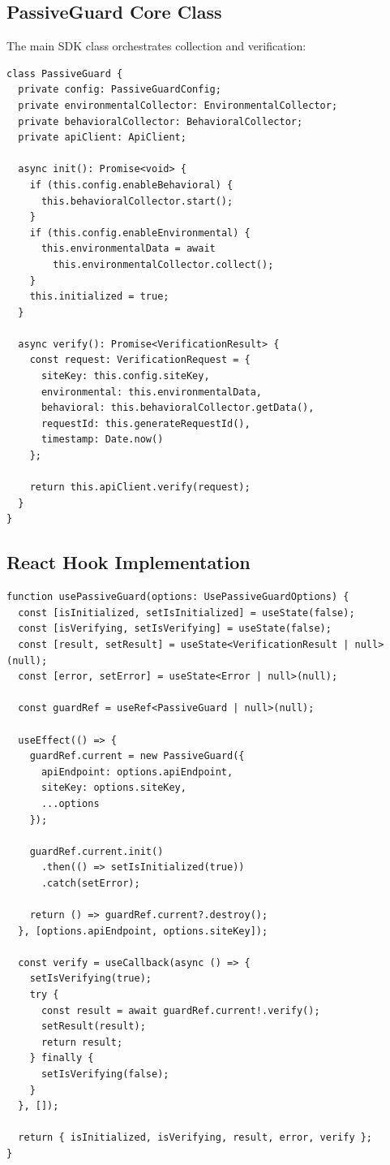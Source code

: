 \subsection{PassiveGuard Core Class}

The main SDK class orchestrates collection and verification:

\begin{verbatim}
class PassiveGuard {
  private config: PassiveGuardConfig;
  private environmentalCollector: EnvironmentalCollector;
  private behavioralCollector: BehavioralCollector;
  private apiClient: ApiClient;
  
  async init(): Promise<void> {
    if (this.config.enableBehavioral) {
      this.behavioralCollector.start();
    }
    if (this.config.enableEnvironmental) {
      this.environmentalData = await 
        this.environmentalCollector.collect();
    }
    this.initialized = true;
  }
  
  async verify(): Promise<VerificationResult> {
    const request: VerificationRequest = {
      siteKey: this.config.siteKey,
      environmental: this.environmentalData,
      behavioral: this.behavioralCollector.getData(),
      requestId: this.generateRequestId(),
      timestamp: Date.now()
    };
    
    return this.apiClient.verify(request);
  }
}
\end{verbatim}

\subsection{React Hook Implementation}

\begin{verbatim}
function usePassiveGuard(options: UsePassiveGuardOptions) {
  const [isInitialized, setIsInitialized] = useState(false);
  const [isVerifying, setIsVerifying] = useState(false);
  const [result, setResult] = useState<VerificationResult | null>(null);
  const [error, setError] = useState<Error | null>(null);
  
  const guardRef = useRef<PassiveGuard | null>(null);
  
  useEffect(() => {
    guardRef.current = new PassiveGuard({
      apiEndpoint: options.apiEndpoint,
      siteKey: options.siteKey,
      ...options
    });
    
    guardRef.current.init()
      .then(() => setIsInitialized(true))
      .catch(setError);
      
    return () => guardRef.current?.destroy();
  }, [options.apiEndpoint, options.siteKey]);
  
  const verify = useCallback(async () => {
    setIsVerifying(true);
    try {
      const result = await guardRef.current!.verify();
      setResult(result);
      return result;
    } finally {
      setIsVerifying(false);
    }
  }, []);
  
  return { isInitialized, isVerifying, result, error, verify };
}
\end{verbatim}

